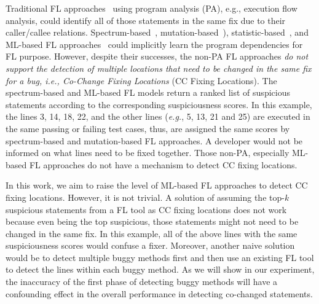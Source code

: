 Traditional FL approaches~\cite{zhang-fse09,ICICA-10} using program
analysis (PA), e.g., execution flow analysis, could identify all of
those statements in the same fix due to their caller/callee
relations. Spectrum-based~\cite{tarantula05,Ochiai},
mutation-based~\cite{MUSE,papadakis2012using,Metallaxis}),
statistic-based~\cite{liblit-pldi05}, and ML-based FL
approaches~\cite{DeepFL,icse21-fl} could implicitly learn the program
dependencies for FL purpose. However, despite their successes, the non-PA FL
approaches {\em do not support the detection of multiple locations
  that need to be changed in the same fix for a bug, i.e., Co-Change
  Fixing Locations} (CC Fixing Locations).
%
The spectrum-based and ML-based FL models return a ranked list
of suspicious statements according to the corresponding suspiciousness
scores. In this example, the lines 3, 14, 18, 22, and the other lines
({\em e.g.}, 5, 13, 21 and 25) are executed in the same passing or
failing test cases, thus, are assigned the same scores by
spectrum-based and mutation-based FL approaches. A developer would not
be informed on what lines need to be fixed together. Those non-PA,
especially ML-based FL approaches do not have a mechanism to detect
CC fixing locations.

In this work, we aim to raise the level of ML-based FL approaches to
detect CC fixing locations. However, it is not trivial. A solution of
assuming the top-$k$ suspicious statements from a FL tool as CC fixing
locations does not work because even being the top suspicious, those
statements might not need to be changed in the same fix. In this
example, all of the above lines with the same suspiciousness scores
would confuse a fixer. Moreover, another naive solution would be to
detect multiple buggy methods first and then use an existing FL tool
to detect the lines within each buggy method. As we will show in our
experiment, the inaccuracy of the first phase of detecting buggy
methods will have a confounding effect in the overall performance in
detecting co-changed statements.


